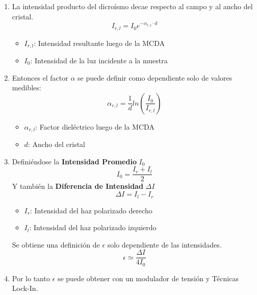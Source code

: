 \documentclass[aps,rmp,reprint,longbibliography]{revtex4-1}
\begin{document}
\begin{enumerate}
\item La intensidad producto del dicroísmo decae respecto al campo y al ancho del cristal.
\begin{equation}\label{eq23}I_{r,l}=I_0 e^{-\alpha_{r,l}\cdot d} \end{equation}
\begin{itemize}
    \item $I_{r,l}$: Intensidad resultante luego de la MCDA 
    \item $I_0$: Intensidad de la luz incidente a la muestra
\end{itemize}
\item Entonces el factor $\alpha$ se puede definir como dependiente solo de valores medibles:
\begin{equation}\label{eq24}\alpha_{r,l}=\frac{1}{d}ln(\frac{I_0}{I_{r,l}})\end{equation}
\begin{itemize}
    \item $\alpha_{r,l}$: Factor dieléctrico luego de la MCDA
    \item $d$: Ancho del cristal
\end{itemize}
\item Definiéndose la \textbf{Intensidad Promedio} $I_0$
\begin{equation}\label{eq25}I_0=\frac{I_r+I_l}{2}\end{equation}
Y también la \textbf{Diferencia de Intensidad} $\Delta I$
\begin{equation}\label{eq26}\Delta I=I_l-I_r\end{equation}
\begin{itemize}
    \item $I_r$: Intensidad del haz polarizado derecho
    \item $I_l$: Intensidad del haz polarizado izquierdo
\end{itemize}
Se obtiene una definición de $\epsilon$ solo dependiente de las intensidades.
\begin{equation}\label{eq27} \epsilon \simeq \frac{\Delta I}{4 I_0}\end{equation}
\item Por lo tanto $\epsilon$ se puede obtener con un modulador de tensión y Técnicas Lock-In.
\end{enumerate}
\end{document}
